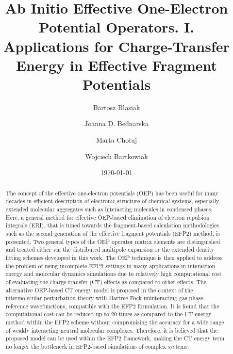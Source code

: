 \documentclass[aip,jcp,amsmath,amssymb,reprint,floatfix]{revtex4-1}
\begin{document}

\title{Ab Initio Effective One-Electron Potential Operators. I.
Applications for Charge-Transfer Energy in Effective Fragment Potentials}

\author{Bartosz B{\l}asiak}

\author{Joanna D. Bednarska}
\author{Marta Cho{\l}uj} 
\author{Wojciech Bartkowiak}


\date{\today}

\begin{abstract}
The concept of the effective one\hyp{}electron potentials (OEP) has been useful for many decades
in efficient description of electronic structure of chemical systems, especially extended
molecular aggregates such as interacting molecules in condensed phases.
Here, a general method for effective OEP\hyp{}based elimination of electron repulsion integrals (ERI),
that is tuned
towards the fragment\hyp{}based calculation methodologies
such as the second generation of the effective fragment potentials (EFP2) method,
is presented.
Two general types of the OEP operator matrix elements
are distinguished and treated either via the distributed multipole expansion
or the extended density fitting schemes developed in this work. 
The OEP technique is then applied
to address the problem of using incomplete EFP2 settings in many
applications in interaction energy and 
molecular dynamics simulations 
due to relatively high computational cost of evaluating the
charge transfer (CT) effects as compared to other effects.
The alternative OEP\hyp{}based CT energy model is proposed
in the context of the
intermolecular perturbation theory with Hartree\hyp{}Fock uninteracting gas\hyp{}phase 
reference wavefunctions, compatible with the EFP2 formulation.
It is found that the computational cost can be reduced
up to 20 times as compared to the CT energy method within the EFP2 scheme
without compromising the accuracy for a wide range of weakly interacting 
neutral molecular complexes. 
Therefore, it is believed that
the proposed model can be used within 
the EFP2 framework, making the CT energy term no longer the bottleneck
in EFP2\hyp{}based simulations of complex systems.
\end{abstract}
\end{document}
